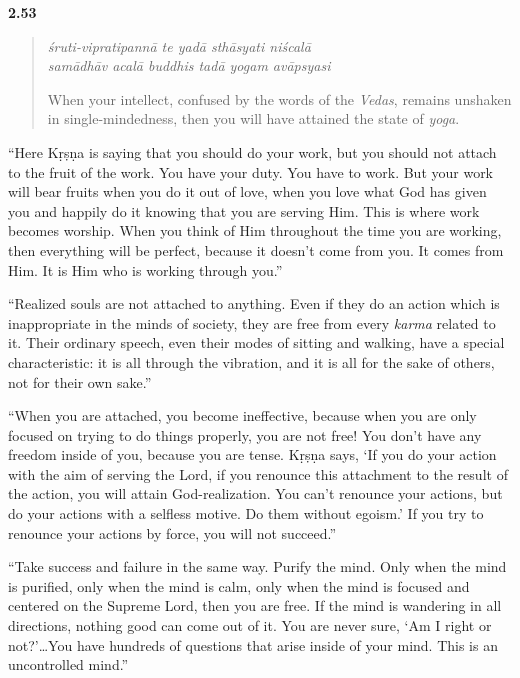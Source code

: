\par\noindent\textbf{2.53}\par
\begin{verse}
\textit{śruti-vipratipannā te yadā sthāsyati niścalā} \\
\textit{samādhāv acalā buddhis tadā yogam avāpsyasi}

\noindent When your intellect, confused by the words of the \textit{Vedas}, remains unshaken in single-mindedness, then you will have attained the state of \textit{yoga}.
\end{verse}
\par


\enquote{Here Kṛṣṇa is saying that you should do your work, but you should not attach to the fruit of the work. You have your duty. You have to work. But your work will bear fruits when you do it out of love, when you love what God has given you and happily do it knowing that you are serving Him. This is where work becomes worship. When you think of Him throughout the time you are working, then everything will be perfect, because it doesn’t come from you. It comes from Him. It is Him who is working through you.}

\enquote{Realized souls are not attached to anything. Even if they do an action which is inappropriate in the minds of society, they are free from every \textit{karma} related to it. Their ordinary speech, even their modes of sitting and walking, have a special characteristic: it is all through the vibration, and it is all for the sake of others, not for their own sake.}

\enquote{When you are attached, you become ineffective, because when you are only focused on trying to do things properly, you are not free! You don’t have any freedom inside of you, because you are tense. Kṛṣṇa says, \enquote{If you do your action with the aim of serving the Lord, if you renounce this attachment to the result of the action, you will attain God-realization. You can’t renounce your actions, but do your actions with a selfless motive. Do them without egoism.} If you try to renounce your actions by force, you will not succeed.}

\enquote{Take success and failure in the same way. Purify the mind. Only when the mind is purified, only when the mind is calm, only when the mind is focused and centered on the Supreme Lord, then you are free. If the mind is wandering in all directions, nothing good can come out of it. You are never sure, \enquote{Am I right or not?}\ldots You have hundreds of questions that arise inside of your mind. This is an uncontrolled mind.}

